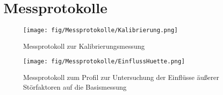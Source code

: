 \section{Messprotokolle}

\begin{figure}[h!]
 \centering
 \texttt{[image: fig/Messprotokolle/Kalibrierung.png]}
 \caption{Messprotokoll zur Kalibrierungsmessung}
 \label{fig:MPKalibrierung}
\end{figure}

\begin{figure}[h!]
 \centering
 \texttt{[image: fig/Messprotokolle/EinflussHuette.png]}
 \caption{Messprotokoll zum Profil zur Untersuchung der Einflüsse äußerer Störfaktoren auf die Basismessung}
 \label{fig:MPHuette}
\end{figure}


